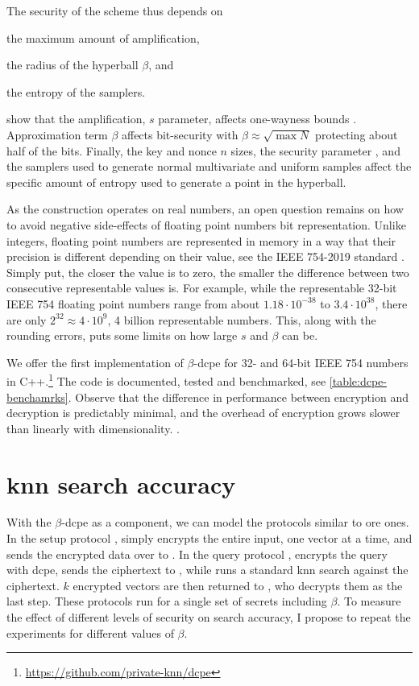 		The security of the scheme thus depends on
		\begin{enumerate*}[label={(\roman*)}]
			\item the maximum amount of amplification,
			\item the radius of the hyperball $\beta$, and
			\item the entropy of the samplers.
		\end{enumerate*}
		\textcite{dcpe} show that the amplification, $s$ parameter, affects one-wayness bounds \cite[Section 7.2]{dcpe}.
		Approximation term $\beta$ affects bit-security with $\beta \approx \sqrt{\max N}$ protecting about half of the bits.
		Finally, the key \key{} and nonce $n$ sizes, the security parameter \secparam{}, and the samplers used to generate normal multivariate and uniform samples affect the specific amount of entropy used to generate a point in the hyperball.

		As the construction operates on real numbers, an open question remains on how to avoid negative side-effects of floating point numbers bit representation.
		Unlike integers, floating point numbers are represented in memory in a way that their precision is different depending on their value, see the IEEE 754-2019 standard \cite{ieee-floating-point}. %
		Simply put, the closer the value is to zero, the smaller the difference between two consecutive representable values is.
		For example, while the representable 32-bit IEEE 754 floating point numbers range from about $1.18 \cdot 10^{-38}$ to $3.4 \cdot 10^{38}$, there are only $2^{32} \approx 4 \cdot 10^9$, 4 billion representable numbers.
		This, along with the rounding errors, puts some limits on how large $s$ and $\beta$ can be.

		We offer the first implementation of \cite{dcpe} $\beta$-\acrshort{dcpe} for 32- and 64-bit IEEE 754 numbers in C++.\footnote{
			\url{https://github.com/private-knn/dcpe}
		}
		The code is documented, tested and benchmarked, see \cref{table:dcpe-benchamrks}.
		Observe that the difference in performance between encryption and decryption is predictably minimal, and the overhead of encryption grows slower than linearly with dimensionality.
.
		


	\section{\texorpdfstring{\acrshort{knn}}{kNN} search accuracy}

		With the $\beta$-\acrshort{dcpe} as a component, we can model the protocols similar to \acrshort{ore} ones.
		In the setup protocol \protocolSetup{}, \user{} simply encrypts the entire input, one vector at a time, and sends the encrypted data over to \server{}.
		In the query protocol \protocolQuery{}, \user{} encrypts the query with \acrshort{dcpe}, sends the ciphertext to \server{}, while \server{} runs a standard \acrshort{knn} search against the ciphertext.
		$k$ encrypted vectors are then returned to \user{}, who decrypts them as the last step.
		These protocols run for a single set of secrets including $\beta$.
		To measure the effect of different levels of security on search accuracy, I propose to repeat the experiments for different values of $\beta$.

